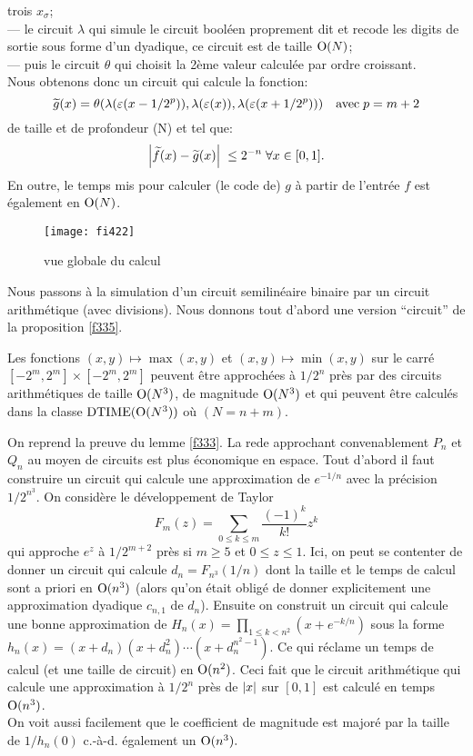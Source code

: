 trois $x_{\sigma}$; \\
--- le circuit  $\lambda$  qui simule le circuit booléen proprement dit et 
recode les digits de sortie sous forme d'un dyadique, ce circuit est de taille 
${\rm O}(N)$;\\
--- puis le circuit  $\theta$  qui choisit la  2ème  valeur calculée par 
ordre croissant.\\
Nous obtenons donc un circuit qui calcule la fonction:
\[
\widetilde{g}(x) = \theta (\lambda(\varepsilon (x-1/2^p)),
\lambda (\varepsilon (x)), \lambda (\varepsilon (x+1/2^p))) \quad \hbox{avec} 
\; p = m+2
\]
 de taille et de profondeur \Oo(N) et tel que: 
\[
\left|{ \widetilde{f}(x) - \widetilde{g}(x) }\right|\;  \leq 2^{-n} \; \forall x \in 
[0,1].
\]
En outre, le temps mis pour calculer  (le code de)  $g$  à partir de 
l'entrée $f$ est également en ${\rm O}(N)$.

\begin{figure}[htbp]  
\begin{center}
\texttt{[image: fi422]}
\end{center}
\caption[vue globale du calcul]{\label{ffi422}  
vue globale du calcul}  
\end{figure}  
\eop

\medskip Nous passons à la simulation d'un circuit semilinéaire binaire par un circuit arithmétique (avec divisions). 
Nous donnons tout d'abord une version ``circuit'' de la proposition \ref{f335}.

\begin{fproposition} \label{f426}
Les fonctions  $(x,y) \mapsto \max(x,y)$ et $(x,y) \mapsto \min(x,y)$   sur le carré  $[-2^m, 2^m] \times [-2^m, 2^m]$   peuvent être approchées à  $1/2^n$ près par des circuits arithmétiques de taille  ${\rm O}(N^3)$, 
de magnitude  ${\rm O}(N^3)$ et qui peuvent être calculés dans la classe 
${\rm DTIME} ({\rm O}(N^3))$ où $(N = n+m)$.
\end{fproposition} 

\proof 
On reprend la preuve du lemme \ref{f333}. La re\pres de \pols approchant 
convenablement  $ P_n $ et $ Q_n $  au moyen de circuits est plus économique en espace. Tout d'abord il faut construire un circuit qui calcule une approximation de $ e^{-1/n} $ avec la précision $1/2^{n^3}$. 
On considère le développement de Taylor  
\[
F_m(z) = \sum_{0\leq k\leq m} \frac{(-1)^k}{k!} z^k
\] 
qui approche $ e^{z} $ à $1/2^{m+2}$  près si  $m\geq 5$ et $0\leq z\leq 1$. 
Ici, on peut se contenter de donner un circuit qui calcule $d_n = F_{n^3}(1/n)$ dont la taille et le temps de calcul sont a priori en $ {\rm O}(n^3) $ (alors qu'on était obligé de donner explicitement une approximation dyadique $c_{n,1}$  de $d_n$). 
Ensuite on construit un circuit qui calcule une bonne approximation 
de  $H_n(x) = \prod_{1 \leq k < n^2} (x+e^{-k/n})$ sous la forme  
$h_n(x) = (x+d_n)(x+d_n^2)\cdots(x+d_n^{n^2-1})$.
Ce qui réclame un temps de calcul (et une taille de circuit) en  ${\rm O}(n^2)$. 
Ceci fait que le circuit arithmétique qui calcule une approximation  à 
$ 1/2^n $ près  de  $\left|{x}\right|$  sur  $[0,1]$   
est calculé en temps ${\rm O}(n^3)$. \\ 
On voit aussi facilement que le coefficient de magnitude est majoré par la 
taille de $ 1/h_n(0) $ c.-à-d. également un $ {\rm O}(n^3).$ 	\eop
 
